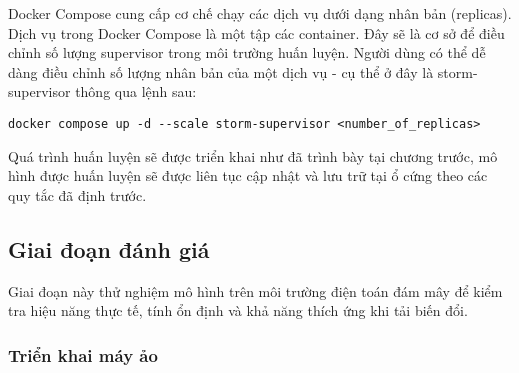 Docker Compose cung cấp cơ chế chạy các dịch vụ dưới dạng nhân bản (replicas). Dịch vụ trong Docker Compose là một tập các container. Đây sẽ là cơ sở để điều chỉnh số lượng supervisor trong môi trường huấn luyện. Người dùng có thể dễ dàng điều chỉnh số lượng nhân bản của một dịch vụ - cụ thể ở đây là storm-supervisor thông qua lệnh sau:

\begin{verbatim}
docker compose up -d --scale storm-supervisor <number_of_replicas>
\end{verbatim}

Quá trình huấn luyện sẽ được triển khai như đã trình bày tại chương trước, mô hình được huấn luyện sẽ được liên tục cập nhật và lưu trữ tại ổ cứng theo các quy tắc đã định trước.

\subsection{Giai đoạn đánh giá}

Giai đoạn này thử nghiệm mô hình trên môi trường điện toán đám mây để kiểm tra hiệu năng thực tế, tính ổn định và khả năng thích ứng khi tải biến đổi.

\subsubsection{Triển khai máy ảo}

